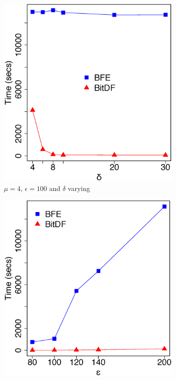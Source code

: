 \begin{figure}
    \centering
    \begin{subfigure}[t]{0.25\textwidth}
        \includegraphics[width=\textwidth]{images/Brinkhoff_n_4_g_200_varying_l.eps}
        \caption{$\mu = 4$, $\epsilon = 100$ and $\delta$ varying}
        \label{fig:brinkhoff_vary_l}
    \end{subfigure}
    \begin{subfigure}[t]{0.25\textwidth}
        \includegraphics[width=\textwidth]{images/Brinkhoff_n_4_l_8_varying_g.eps}

\end{subfigure}
\end{figure}
